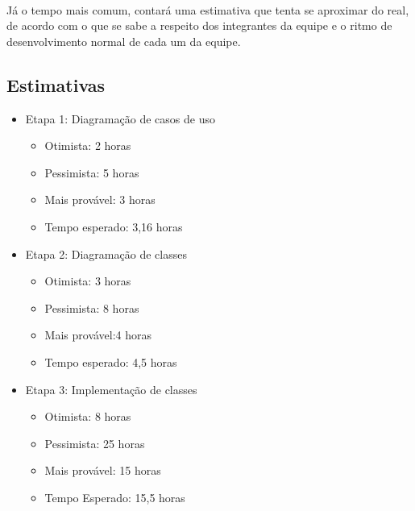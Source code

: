 \documentclass[12pt,a4paper]{article}
\begin{document}
	\paragraph{} Já o tempo mais comum, contará uma estimativa que tenta se aproximar do real, de acordo com o que se sabe a respeito dos integrantes da equipe e o ritmo de desenvolvimento normal de cada um da equipe.
	
	\subsection{Estimativas}	
	
	\begin{itemize}
		\item Etapa 1: Diagramação de casos de uso
		\begin{itemize}
			\item Otimista: 2 horas
			\item Pessimista: 5 horas
			\item Mais provável: 3 horas
			\item Tempo esperado: 3,16 horas
		\end{itemize}
		\item Etapa 2: Diagramação de classes
		
		\begin{itemize}
			\item Otimista: 3 horas
			\item Pessimista: 8 horas
			\item Mais provável:4 horas
			\item Tempo esperado: 4,5 horas
		\end{itemize}
			\item Etapa 3: Implementação de classes
		\begin{itemize}
				\item Otimista: 8 horas
				\item Pessimista: 25 horas
				\item Mais provável: 15 horas
				\item Tempo Esperado: 15,5 horas
				

\end{itemize}
\end{itemize}
\end{document}
